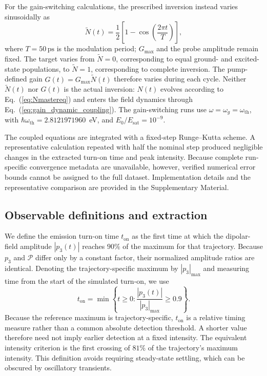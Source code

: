 \documentclass{optica-article}
\begin{document}
For the gain-switching calculations, the prescribed inversion instead varies sinusoidally as
\begin{equation}
\widetilde N(t) = \frac{1}{2}\!\left[1-\cos\!\left(\frac{2\pi t}{T}\right)\right],
\label{eq:Ntilde}
\end{equation}
where $T=50\,\mathrm{ps}$ is the modulation period; $G_{\max}$ and the probe amplitude remain fixed. The target varies from $\widetilde N=0$, corresponding to equal ground- and excited-state populations, to $\widetilde N=1$, corresponding to complete inversion. The pump-defined gain $G(t)=G_{\max}\widetilde N(t)$ therefore varies during each cycle. Neither $\widetilde N(t)$ nor $G(t)$ is the actual inversion: $N(t)$ evolves according to Eq.~(\ref{eq:Nmastereq}) and enters the field dynamics through Eq.~(\ref{eq:gain_dynamic_coupling}). The gain-switching runs use $\omega=\omega_g=\omega_{\mathrm{th}}$, with $\hbar\omega_{\mathrm{th}}=2.8121971960$~eV, and $E_0/E_{\mathrm{sat}}=10^{-9}$.

The coupled equations are integrated with a fixed-step Runge--Kutta scheme. A representative calculation repeated with half the nominal step produced negligible changes in the extracted turn-on time and peak intensity. Because complete run-specific convergence metadata are unavailable, however, verified numerical error bounds cannot be assigned to the full dataset. Implementation details and the representative comparison are provided in the Supplementary Material.

\subsection{Observable definitions and extraction}
\label{sec:observables}

We define the emission turn-on time $t_{\mathrm{on}}$ as the first time at which the dipolar-field amplitude $|p_3(t)|$ reaches $90\%$ of the maximum for that trajectory. Because $p_3$ and $\mathcal P$ differ only by a constant factor, their normalized amplitude ratios are identical. Denoting the trajectory-specific maximum by $|p_3|_{\max}$ and measuring time from the start of the simulated turn-on, we use
\begin{equation}
t_{\mathrm{on}}=\min\left\{t\geq 0:\frac{|p_3(t)|}{|p_3|_{\max}}\geq 0.9\right\}.
\label{eq:turn_on_time}
\end{equation}
Because the reference maximum is trajectory-specific, $t_{\mathrm{on}}$ is a relative timing measure rather than a common absolute detection threshold. A shorter value therefore need not imply earlier detection at a fixed intensity. The equivalent intensity criterion is the first crossing of $81\%$ of the trajectory's maximum intensity. This definition avoids requiring steady-state settling, which can be obscured by oscillatory transients.
\end{document}
